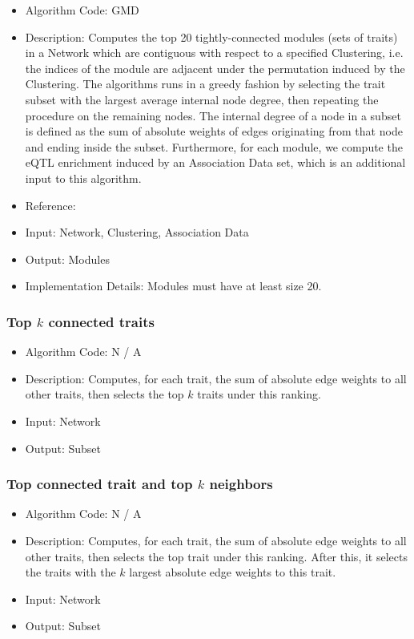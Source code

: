 \documentclass{article}
\begin{document}
\begin{itemize}
\item Algorithm Code: GMD
\item Description: Computes the top 20 tightly-connected modules (sets of traits) in a Network which are contiguous with respect to a specified Clustering, i.e. the indices of the module are adjacent under the permutation induced by the Clustering. The algorithms runs in a greedy fashion by selecting the trait subset with the largest average internal node degree, then repeating the procedure on the remaining nodes. The internal degree of a node in a subset is defined as the sum of absolute weights of edges originating from that node and ending inside the subset. Furthermore, for each module, we compute the eQTL enrichment induced by an Association Data set, which is an additional input to this algorithm.
\item Reference: \cite{ModuleAnalysis}
\item Input: Network, Clustering, Association Data
\item Output: Modules
\item Implementation Details: Modules must have at least size 20.
\end{itemize}

\subsubsection{Top $k$ connected traits}

\begin{itemize}
\item Algorithm Code: N / A
\item Description: Computes, for each trait, the sum of absolute edge weights to all other traits, then selects the top $k$ traits under this ranking.
\item Input: Network
\item Output: Subset
\end{itemize}

\subsubsection{Top connected trait and top $k$ neighbors}

\begin{itemize}
\item Algorithm Code: N / A
\item Description: Computes, for each trait, the sum of absolute edge weights to all other traits, then selects the top trait under this ranking. After this, it selects the traits with the $k$ largest absolute edge weights to this trait.
\item Input: Network
\item Output: Subset
\end{itemize}


\end{document}
